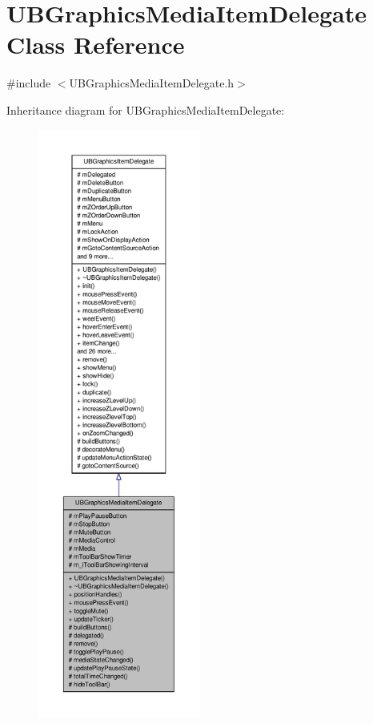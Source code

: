 \hypertarget{class_u_b_graphics_media_item_delegate}{\section{U\-B\-Graphics\-Media\-Item\-Delegate Class Reference}
\label{df/dfb/class_u_b_graphics_media_item_delegate}
}


{\ttfamily \#include $<$U\-B\-Graphics\-Media\-Item\-Delegate.\-h$>$}



Inheritance diagram for U\-B\-Graphics\-Media\-Item\-Delegate\-:
\nopagebreak
\begin{figure}[H]
\begin{center}
\leavevmode
\includegraphics[height=550pt]{d0/deb/class_u_b_graphics_media_item_delegate__inherit__graph}
\end{center}
\end{figure}


